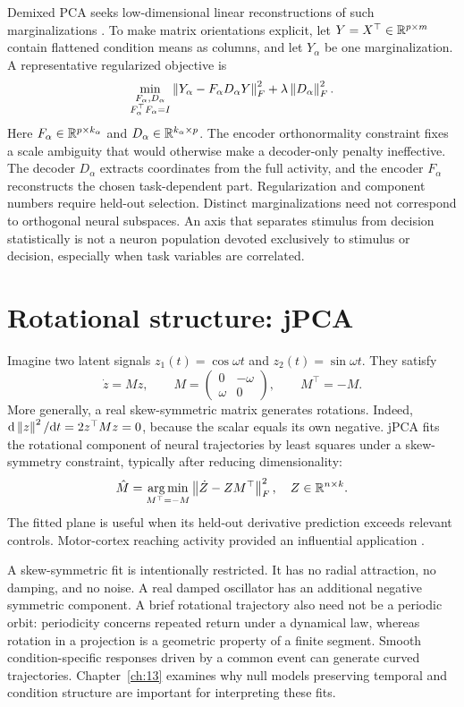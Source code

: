 Demixed PCA seeks low-dimensional linear reconstructions of such marginalizations \citep{app_kobak2016}. To make matrix orientations explicit, let $Y=X^\top\in\mathbb{R}^{p\times m}$ contain flattened condition means as columns, and let $Y_\alpha$ be one marginalization. A representative regularized objective is
\begin{equation}
 \min_{\substack{F_\alpha,D_\alpha\\F_\alpha^\top F_\alpha=I}}
 \left\lVert Y_\alpha-F_\alpha D_\alpha Y\right\rVert_F^2
 +\lambda\left\lVert D_\alpha\right\rVert_F^2.\label{eq:06-dpca}
\end{equation}
Here $F_\alpha\in\mathbb{R}^{p\times k_\alpha}$ and $D_\alpha\in\mathbb{R}^{k_\alpha\times p}$. The encoder orthonormality constraint fixes a scale ambiguity that would otherwise make a decoder-only penalty ineffective. The decoder $D_\alpha$ extracts coordinates from the full activity, and the encoder $F_\alpha$ reconstructs the chosen task-dependent part. Regularization and component numbers require held-out selection. Distinct marginalizations need not correspond to orthogonal neural subspaces. An axis that separates stimulus from decision statistically is not a neuron population devoted exclusively to stimulus or decision, especially when task variables are correlated.

\section{Rotational structure: jPCA}
Imagine two latent signals $z_1(t)=\cos\omega t$ and $z_2(t)=\sin\omega t$. They satisfy
\[
 \dot z=Mz,\qquad
 M=\begin{pmatrix}0&-\omega\\\omega&0\end{pmatrix},\qquad M^\top=-M.
\]
More generally, a real skew-symmetric matrix generates rotations. Indeed,
$\mathrm d\left\lVert z\right\rVert^2/\mathrm dt=2z^\top Mz=0$, because the scalar equals its own negative. jPCA fits the rotational component of neural trajectories by least squares under a skew-symmetry constraint, typically after reducing dimensionality:
\begin{equation}
 \hat M=\operatorname*{arg\,min}_{M^\top=-M}\left\lVert \dot Z-ZM^\top\right\rVert_F^2,
 \quad Z\in\mathbb{R}^{n\times k}.\label{eq:06-jpca}
\end{equation}
The fitted plane is useful when its held-out derivative prediction exceeds relevant controls. Motor-cortex reaching activity provided an influential application \citep{app_churchland2012}.

A skew-symmetric fit is intentionally restricted. It has no radial attraction, no damping, and no noise. A real damped oscillator has an additional negative symmetric component. A brief rotational trajectory also need not be a periodic orbit: periodicity concerns repeated return under a dynamical law, whereas rotation in a projection is a geometric property of a finite segment. Smooth condition-specific responses driven by a common event can generate curved trajectories. Chapter~\ref{ch:13} examines why null models preserving temporal and condition structure are important for interpreting these fits.

